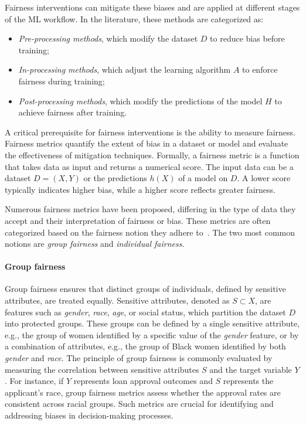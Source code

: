 %
Fairness interventions can mitigate these biases and are applied at different stages of the \gls{ML} workflow.
%
In the literature, these methods are categorized as:
%
\begin{itemize}
    \item \textit{Pre-processing methods}, which modify the dataset \(D\) to reduce bias before training;
    \item \textit{In-processing methods}, which adjust the learning algorithm \(A\) to enforce fairness during training;
    \item \textit{Post-processing methods}, which modify the predictions of the model \(H\) to achieve fairness after training.
\end{itemize}

%
A critical prerequisite for fairness interventions is the ability to measure fairness.
%
Fairness metrics quantify the extent of bias in a dataset or model and evaluate the effectiveness of mitigation techniques.
%
Formally, a fairness metric is a function that takes data as input and returns a numerical score.
%
The input data can be a dataset \(D = (X, Y)\) or the predictions \(h(X)\) of a model on \(D\).
%
A lower score typically indicates higher bias, while a higher score reflects greater fairness.

%
Numerous fairness metrics have been proposed, differing in the type of data they accept and their interpretation of fairness or bias.
%
These metrics are often categorized based on the fairness notion they adhere to~\cite{DBLP:journals/csur/MehrabiMSLG21}.
%
The two most common notions are \textit{group fairness} and \textit{individual fairness}.


\paragraph{Group fairness}\label{par:group-fairness}
%
Group fairness ensures that distinct groups of individuals, defined by sensitive attributes, are treated equally.
%
Sensitive attributes, denoted as \( S \subset X \), are features such as \emph{gender}, \emph{race}, \emph{age}, or social status, which partition the dataset \( D \) into protected groups.
%
These groups can be defined by a single sensitive attribute, e.g., the group of women identified by a specific value of the \textit{gender} feature, or by a combination of attributes, e.g., the group of Black women identified by both \textit{gender} and \textit{race}.
%
The principle of group fairness is commonly evaluated by measuring the correlation between sensitive attributes \( S \) and the target variable \( Y \).
%
For instance, if \( Y \) represents loan approval outcomes and \( S \) represents the applicant's race, group fairness metrics assess whether the approval rates are consistent across racial groups.
%
Such metrics are crucial for identifying and addressing biases in decision-making processes.


